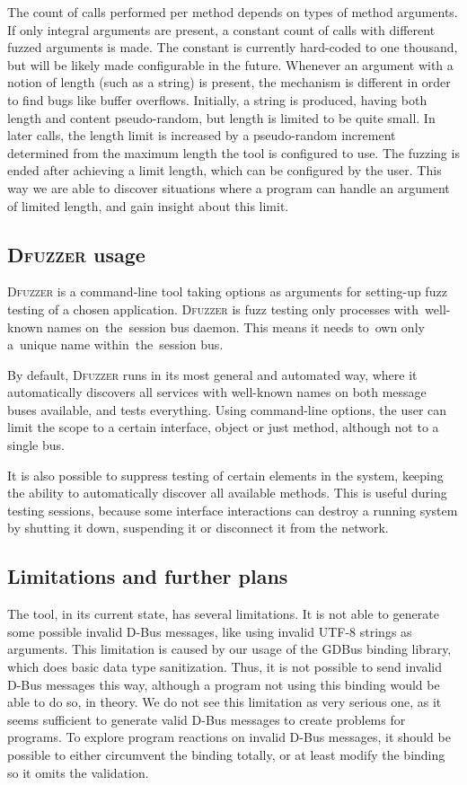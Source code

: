 \documentclass[conference]{IEEEtran}
\begin{document}
The count of calls performed per method depends on types of method arguments.
If only integral arguments are present, a constant count of calls with
different fuzzed arguments is made. The constant is currently hard-coded to one
thousand, but will be likely made configurable in the future.  Whenever an
argument with a notion of length (such as a string) is present, the mechanism
is different in order to find bugs like buffer overflows. Initially, a string
is produced, having both length and content pseudo-random, but length is
limited to be quite small. In later calls, the length limit is increased by a
pseudo-random increment determined from the maximum length the tool is
configured to use. The fuzzing is ended after achieving a limit length, which
can be configured by the user. This way we are able to discover situations
where a program can handle an argument of limited length, and gain insight
about this limit.


\subsection{\textsc{Dfuzzer} usage}
\textsc{Dfuzzer} is a command-line tool taking options as arguments for setting-up fuzz
testing of a chosen application. \textsc{Dfuzzer} is fuzz testing only processes
with~well-known names on~the~session bus daemon. This means it needs to~own
only a~unique name within~the~session bus.


By default, \textsc{Dfuzzer} runs in its most general and automated way, where
it automatically discovers all services with well-known names on both message
buses available, and tests everything. Using command-line options, the user can
limit the scope to a certain interface, object or just method, although not to
a single bus.


It is also possible to suppress testing of certain elements in the system,
keeping the ability to automatically discover all available methods. This is
useful during testing sessions, because some interface interactions can
destroy a running system by shutting it down, suspending it or disconnect it
from the network.

\subsection{Limitations and further plans}
The tool, in its current state, has several limitations. It is not able to generate some possible invalid D-Bus
messages, like using invalid UTF-8 strings as arguments. This limitation is
caused by our usage of the GDBus binding library, which does basic data type
sanitization. Thus, it is not possible to send invalid D-Bus messages this way,
although a program not using this binding would be able to do so, in theory. We
do not see this limitation as very serious one, as it seems sufficient to
generate valid D-Bus messages to create problems for programs. To explore
program reactions on invalid D-Bus messages, it should be possible to either
circumvent the binding totally, or at least modify the binding so it omits the
validation.
\end{document}
